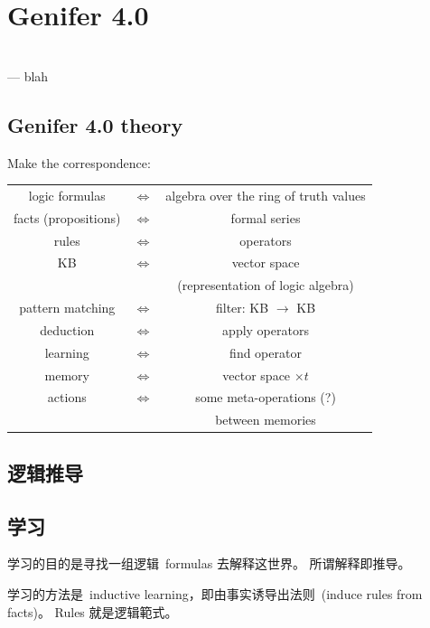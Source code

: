 \chapter{Genifer 4.0}
\begin{flushright}
\\ --- blah
\end{flushright}
\minitoc

\section{Genifer 4.0 theory}

Make the correspondence:
\begin{center}
\begin{tabular}{ccc}
logic formulas & $\Leftrightarrow$ & algebra over the ring of truth values \\
facts (propositions) & $\Leftrightarrow$ & formal series \\
rules & $\Leftrightarrow$ & operators \\
KB & $\Leftrightarrow$ & vector space \\
   &					& (representation of logic algebra) \\ 
pattern matching & $\Leftrightarrow$ & filter: KB $\rightarrow$ KB \\ 
deduction & $\Leftrightarrow$ & apply operators \\
learning & $\Leftrightarrow$ & find operator \\ 
memory & $\Leftrightarrow$ & vector space $\times t$ \\ 
actions & $\Leftrightarrow$ & some meta-operations (?) \\
	 &						 & between memories
\end{tabular}
\end{center}

\section{逻辑推导}

\section{学习}


学习的目的是寻找一组逻辑\  formulas 去解释这世界。  所谓解释即推导。

学习的方法是\  inductive learning，即由事实诱导出法则\  (induce rules from facts)。 Rules 就是逻辑範式。

